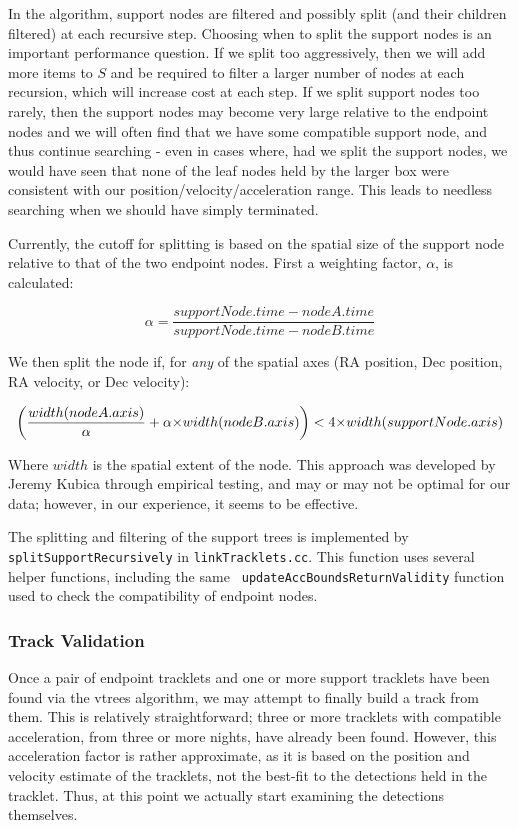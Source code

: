 In the algorithm, support nodes are filtered and possibly split (and
their children filtered) at each recursive step.  Choosing when to
split the support nodes is an important performance question.  If we
split too aggressively, then we will add more items to $S$ and be
required to filter a larger number of nodes at each recursion, which
will increase cost at each step.  If we split support nodes too
rarely, then the support nodes may become very large relative to the
endpoint nodes and we will often find that we have some compatible
support node, and thus continue searching - even in cases where, had
we split the support nodes, we would have seen that none of the leaf
nodes held by the larger box were consistent with our
position/velocity/acceleration range.  This leads to needless
searching when we should have simply terminated.

Currently, the cutoff for splitting is based on the spatial size of
the support node relative to that of the two endpoint nodes.  First
a weighting factor, $\alpha$, is calculated:

\begin{equation}
\alpha = \frac{supportNode.time - nodeA.time}{supportNode.time - nodeB.time}
\end{equation}

We then split the node if, for \textit{any} of the spatial axes (RA position, Dec position, RA velocity, or Dec velocity):

\begin{equation}
\bigg(\frac{width(nodeA.axis)}{\alpha} + \alpha \hbox{$\times$} width(nodeB.axis)\bigg) < 4 \hbox{$\times$} width(supportNode.axis)
\end{equation}

Where $width$ is the spatial extent of the node.  This approach was
developed by Jeremy Kubica through empirical testing, and may or may
not be optimal for our data; however, in our experience, it seems to
be effective.

The splitting and filtering of the support trees is implemented by
{\tt splitSupportRecursively} in {\tt linkTracklets.cc}.  This
function uses several helper functions, including the same {\tt
  updateAccBoundsReturnValidity} function used to check the
compatibility of endpoint nodes.


\subsubsection{Track Validation}

Once a pair of endpoint tracklets and one or more support tracklets
have been found via the vtrees algorithm, we may attempt to finally
build a track from them.  This is relatively straightforward; three or
more tracklets with compatible acceleration, from three or more
nights, have already been found.  However, this acceleration factor is
rather approximate, as it is based on the position and velocity
estimate of the tracklets, not the best-fit to the detections held in
the tracklet.  Thus, at this point we actually start examining the
detections themselves.

